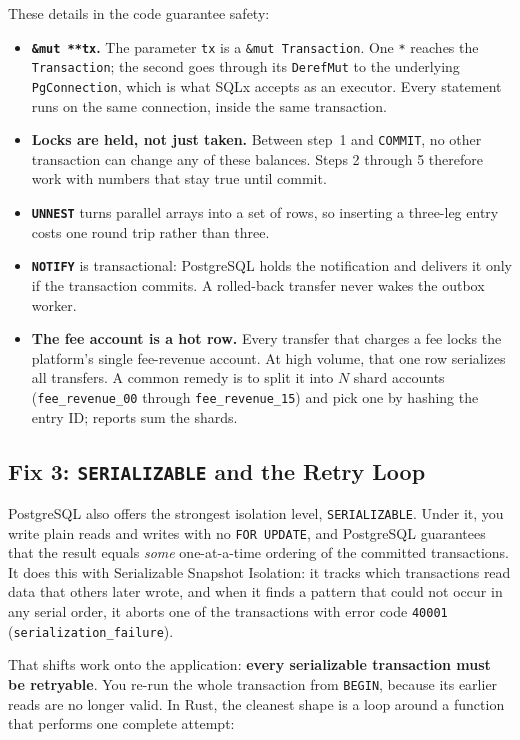 These details in the code guarantee safety:
\begin{itemize}
  \item \textbf{\texttt{\&mut **tx}.} The parameter \texttt{tx} is a \texttt{\&mut Transaction}. One \texttt{*} reaches the \texttt{Transaction}; the second goes through its \texttt{DerefMut} to the underlying \texttt{PgConnection}, which is what SQLx accepts as an executor. Every statement runs on the same connection, inside the same transaction.
  \item \textbf{Locks are held, not just taken.} Between step~1 and \texttt{COMMIT}, no other transaction can change any of these balances. Steps 2 through 5 therefore work with numbers that stay true until commit.
  \item \textbf{\texttt{UNNEST}} turns parallel arrays into a set of rows, so inserting a three-leg entry costs one round trip rather than three.
  \item \textbf{\texttt{NOTIFY}} is transactional: PostgreSQL holds the notification and delivers it only if the transaction commits. A rolled-back transfer never wakes the outbox worker.
  \item \textbf{The fee account is a hot row.} Every transfer that charges a fee locks the platform's single fee-revenue account. At high volume, that one row serializes all transfers. A common remedy is to split it into $N$ shard accounts (\texttt{fee\_revenue\_00} through \texttt{fee\_revenue\_15}) and pick one by hashing the entry ID; reports sum the shards.
\end{itemize}

\subsection{Fix 3: \texttt{SERIALIZABLE} and the Retry Loop}

PostgreSQL also offers the strongest isolation level, \texttt{SERIALIZABLE}. Under it, you write plain reads and writes with no \texttt{FOR UPDATE}, and PostgreSQL guarantees that the result equals \emph{some} one-at-a-time ordering of the committed transactions. It does this with Serializable Snapshot Isolation: it tracks which transactions read data that others later wrote, and when it finds a pattern that could not occur in any serial order, it aborts one of the transactions with error code \texttt{40001} (\texttt{serialization\_failure}).

That shifts work onto the application: \textbf{every serializable transaction must be retryable}. You re-run the whole transaction from \texttt{BEGIN}, because its earlier reads are no longer valid. In Rust, the cleanest shape is a loop around a function that performs one complete attempt:

